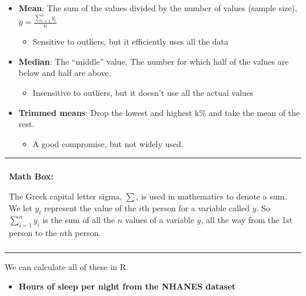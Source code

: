 \documentclass[
]{book}
\newenvironment{Shaded}{\begin{snugshade}}{\end{snugshade}}
\newcommand{\KeywordTok}[1]{\textcolor[rgb]{0.13,0.29,0.53}{\textbf{#1}}}
\newcommand{\NormalTok}[1]{#1}
\newcommand{\OperatorTok}[1]{\textcolor[rgb]{0.81,0.36,0.00}{\textbf{#1}}}
\newcommand{\StringTok}[1]{\textcolor[rgb]{0.31,0.60,0.02}{#1}}
\providecommand{\tightlist}{%
  \setlength{\itemsep}{0pt}\setlength{\parskip}{0pt}}
\newenvironment{mathbox}
{
    \begin{center}
    
    \begin{tabular}{|p{0.8\textwidth}|}
    \rowcolor{LightYellow}
    \hline\\
    \rowcolor{LightYellow}
    \textbf{Math Box:}
}
{
    \\\rowcolor{LightYellow}
    \\\hline
    \end{tabular} 
    \end{center}
}
\begin{document}
\begin{itemize}
\tightlist
\item
  \textbf{Mean}: The sum of the values divided by the number of values (sample size), \(\bar{y} = \frac{\sum^n_{i=1}y_i}{n}\)

  \begin{itemize}
  \tightlist
  \item
    Sensitive to outliers, but it efficiently uses all the data
  \end{itemize}
\item
  \textbf{Median}: The ``middle'' value. The number for which half of the values are below and half are above.

  \begin{itemize}
  \tightlist
  \item
    Insensitive to outliers, but it doesn't use all the actual values
  \end{itemize}
\item
  \textbf{Trimmed means}: Drop the lowest and highest k\% and take the mean of the rest.

  \begin{itemize}
  \tightlist
  \item
    A good compromise, but not widely used.
  \end{itemize}
\end{itemize}

\begin{mathbox}
The Greek capital letter sigma, \(\sum\), is used in mathematics to
denote a sum. We let \(y_i\) represent the value of the \(i\)th person
for a variable called \(y\). So \(\sum^n_{i=1}y_i\) is the sum of all
the \(n\) values of a variable \(y\), all the way from the 1st person to
the \(n\)th person.
\end{mathbox}

We can calculate all of these in R.

\begin{itemize}
\tightlist
\item
  \textbf{Hours of sleep per night from the NHANES dataset}
\end{itemize}

\begin{Shaded}
\end{Shaded}
\end{document}
